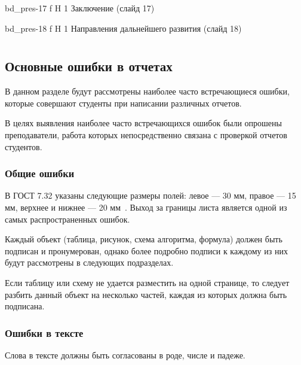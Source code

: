 \begin{appendices}
	{bd_pres-17} %
	{f} %
	{H} %
	{1\textwidth} %
	{Заключение (слайд 17)} %
	
	{bd_pres-18} %
	{f} %
	{H} %
	{1\textwidth} %
	{Направления дальнейшего развития (слайд 18)} %
	
	
	
	
	
	
	
	
	
	
	
	
	
	\chapter{}
	\label{app:Mist}
	\section{Основные ошибки в отчетах}
	В данном разделе будут рассмотрены наиболее часто встречающиеся ошибки, которые совершают студенты при написании различных отчетов.
	
	В целях выявления наиболее часто встречающихся ошибок были опрошены преподаватели, работа которых непосредственно связана с проверкой отчетов студентов.
	
	\subsection{Общие ошибки}
	В ГОСТ 7.32 указаны следующие размеры полей: левое --- 30 мм, правое --- 15 мм, верхнее и нижнее --- 20 мм~\cite{GOST732}. Выход за границы листа является одной из самых распространенных ошибок.
	
	Каждый объект (таблица, рисунок, схема алгоритма, формула) должен быть подписан и пронумерован, однако более подробно подписи к каждому из них будут рассмотрены в следующих подразделах.
	
	Если таблицу или схему не удается разместить на одной странице, то следует разбить данный объект на несколько частей, каждая из которых должна быть подписана.
	
	\subsection{Ошибки в тексте}
	Слова в тексте должны быть согласованы в роде, числе и падеже.
	

\end{appendices}
